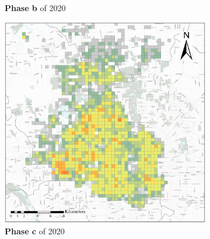\documentclass[preprints,ijgi,submit,moreauthors]{Definitions/mdpi}
\begin{document}
\begin{figure}[ht]
\begin{subfigure}{.28\textwidth}
        \caption{\textbf{Phase b} of 2020}\label{fig:p_b_2020}
    \end{subfigure}
    \begin{subfigure}{.28\textwidth}
        \includegraphics[width=\textwidth]{Figures/BSSPhase3_2020.eps}
        \caption{\textbf{Phase c} of 2020}\label{fig:p_c_2020}
    \end{subfigure}
    \begin{subfigure}{.14\textwidth}

\end{subfigure}
\end{figure}
\end{document}
